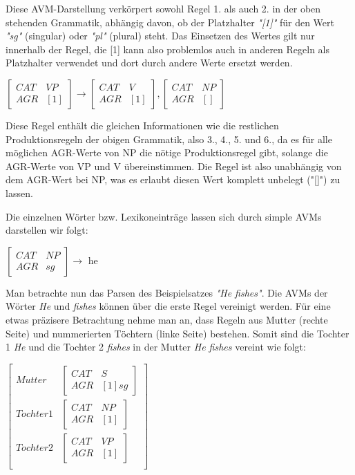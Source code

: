 \documentclass[12pt]{paper}
\begin{document}
Diese AVM-Darstellung verkörpert sowohl Regel 1. als auch 2. in der oben stehenden Grammatik, abhängig davon, ob der Platzhalter \textit{"[1]"} für den Wert \textit{"sg"} (singular) oder \textit{"pl"} (plural) steht. Das Einsetzen des Wertes gilt nur innerhalb der Regel, die [1] kann also problemlos auch in anderen Regeln als Platzhalter verwendet und dort durch andere Werte ersetzt werden.

$\begin{bmatrix} 
CAT & VP \\
AGR & [1]
\end{bmatrix} 
\rightarrow
\begin{bmatrix} 
CAT & V \\
AGR & [1]
\end{bmatrix},
\begin{bmatrix} 
CAT & NP \\
AGR & [] 
\end{bmatrix}$ 

Diese Regel enthält die gleichen Informationen wie die restlichen Produktionsregeln der obigen Grammatik, also 3., 4., 5. und 6., da es für alle möglichen AGR-Werte von NP die nötige Produktionsregel gibt, solange die AGR-Werte von VP und V übereinstimmen. Die Regel ist also unabhängig von dem AGR-Wert bei NP, was es erlaubt diesen Wert komplett unbelegt ("[]") zu lassen.

Die einzelnen Wörter bzw. Lexikoneinträge lassen sich durch simple AVMs darstellen wir folgt:

$\begin{bmatrix} 
CAT & NP \\
AGR & sg
\end{bmatrix}\rightarrow$ he 

Man betrachte nun das Parsen des Beispielsatzes \textit{"He fishes"}. Die AVMs der Wörter \textit{He} und \textit{fishes} können über die erste Regel vereinigt werden. Für eine etwas präzisere Betrachtung nehme man an, dass Regeln aus Mutter (rechte Seite) und nummerierten Töchtern (linke Seite) bestehen. Somit sind die Tochter 1 \textit{He} und die Tochter 2 \textit{fishes} in der Mutter \textit{He fishes} vereint wie folgt:

$\begin{bmatrix} 
Mutter & \begin{bmatrix} 
CAT & S \\
AGR & [1] sg
\end{bmatrix} \\
Tochter 1 & \begin{bmatrix} 
CAT & NP \\
AGR & [1]
\end{bmatrix} \\
Tochter 2 & \begin{bmatrix} 
CAT & VP \\
AGR & [1]
\end{bmatrix}\\
\end{bmatrix}$
\end{document}
